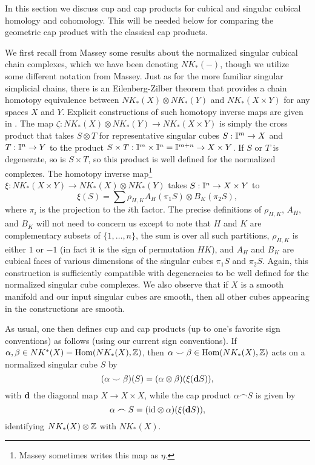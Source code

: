 In this section we discuss cup and cap products for cubical and singular cubical homology and cohomology. This will be needed below for comparing the geometric cap product with the classical cap products.

We first recall from Massey \cite[Chapter XI]{Mas91} some results about the normalized singular cubical chain complexes, which we have been denoting $NK_*(-)$, though we utilize some different notation from Massey. Just as for the more familiar singular simplicial chains, there is an Eilenberg-Zilber theorem that provides a chain homotopy equivalence between $NK_*(X)\otimes NK_*(Y)$ and $NK_*(X \times Y)$ for any spaces $X$ and $Y$. Explicit constructions of such homotopy inverse maps are given in \cite[Section XI.5]{Mas91}.
The map $\zeta: NK_*(X)\otimes NK_*(Y) \to NK_*(X \times Y)$ is simply the cross product that takes $S\otimes T$ for representative singular cubes $S: \mathbb{I}^m \to X$ and $T:\mathbb{I}^n \to Y$ to the product $S \times T:\mathbb{I}^m \times \mathbb{I}^n = \mathbb{I}^{m+n} \to X \times Y$. If $S$ or $T$ is degenerate, so is $S \times T$, so this product is well defined for the normalized complexes. The homotopy inverse map\footnote{Massey sometimes writes this map as $\eta$.} $\xi: NK_*(X \times Y) \to NK_*(X)\otimes NK_*(Y)$ takes $S:\mathbb{I}^n \to X \times Y$ to
$$\xi(S) = \sum \rho_{H,K}A_H(\pi_1S)\otimes B_K(\pi_2S),$$ where $\pi_i$ is the projection to the $i$th factor. The precise definitions of $\rho_{H,K}$, $A_H$, and $B_K$ will not need to concern us except to note that $H$ and $K$ are complementary subsets of $\{1,\ldots, n\}$, the sum is over all such partitions, $\rho_{H,K}$ is either $1$ or $-1$ (in fact it is the sign of permutation $HK$), and $A_H$ and $B_K$ are cubical faces of various dimensions of the singular cubes $\pi_1S$ and $\pi_2S$. Again, this construction is sufficiently compatible with degeneracies to be well defined for the normalized singular cube complexes. We also observe that if $X$ is a smooth manifold and our input singular cubes are smooth, then all other cubes appearing in the constructions are smooth.

As usual, one then defines cup and cap products (up to one's favorite sign conventions) as follows (using our current sign conventions). If $\alpha, \beta \in NK^*(X) = \textup{Hom}(NK_*(X),\mathbb{Z})$, then $\alpha\smile \beta \in \textup{Hom}(NK_*(X),\mathbb{Z})$ acts on a normalized singular cube $S$ by
\begin{equation}\label{E: cubical cup}
(\alpha \smile \beta)(S) = (\alpha\otimes \beta)(\xi(\mathbf{d} S)),
\end{equation}
with $\mathbf{d}$ the diagonal map $X \to X \times X$,
while the cap product $\alpha\frown S$ is given by
\begin{equation}\label{E: cubical cap}
\alpha\frown S = (\mathrm{id}\otimes \alpha) (\xi(\mathbf{d} S)),
\end{equation}
identifying $NK_*(X)\otimes \mathbb{Z}$ with $NK_*(X)$.



